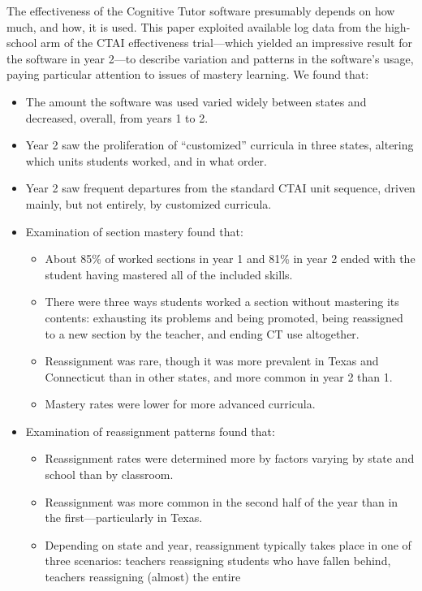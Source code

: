 \documentclass[12pt]{article}\usepackage[]{graphicx}\usepackage[]{color}
\begin{document}
The effectiveness of the Cognitive Tutor software presumably depends
on how much, and how, it is used.
This paper exploited available log data from the high-school arm of the CTAI
effectiveness trial---which yielded an impressive result for the
software in year 2---to describe variation and patterns in the software's
usage, paying particular attention to issues of mastery learning.
We found that:
\begin{itemize}
 \item The amount the software was used varied widely between states
   and decreased, overall, from years 1 to 2.
 \item Year 2 saw the proliferation of ``customized'' curricula in
   three states, altering which units students worked, and in what
   order.
 \item Year 2 saw frequent departures from the standard CTAI unit
   sequence, driven mainly, but not entirely, by customized
   curricula.
 \item Examination of section mastery found that:
 \begin{itemize}
  \item About 85\% of
    worked sections in year 1 and
    81\% in  year 2 ended
    with the student having mastered all of the included skills.
  \item There were three ways students worked a section without
    mastering its contents: exhausting its problems and being
    promoted, being reassigned to a new section by the teacher, and
    ending CT use altogether.
  \item Reassignment was rare, though it was more prevalent in Texas
    and Connecticut than in other states, and more common in year 2
    than 1.
  \item Mastery rates were lower for more advanced curricula.
 \end{itemize}
 \item Examination of reassignment patterns found that:
  \begin{itemize}
   \item Reassignment rates were determined more by factors varying by state and school
     than by classroom.
   \item Reassignment was more common in the second half of the year
     than in the first---particularly in Texas.
   \item Depending on state and year, reassignment typically takes
     place in one of three scenarios: teachers reassigning students
     who have fallen behind, teachers reassigning (almost) the entire

\end{itemize}
\end{itemize}
\end{document}
